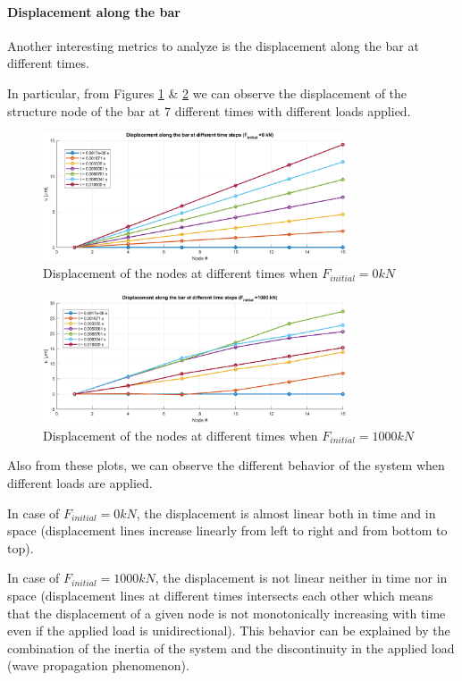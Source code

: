 \paragraph{Displacement along the bar}

Another interesting metrics to analyze is the displacement along the bar at different times.

In particular, from Figures \ref{fig:displacement_F0} \& \ref{fig:displacement_F1000} we can observe the displacement of the structure node of the bar at $7$ different times with different loads applied.

\begin{figure}[H]
    \centering
    \includegraphics[width=0.8\textwidth]{img/displacement_F0.png}
    \caption{Displacement of the nodes at different times when $F_{initial} = 0 kN$}
    \label{fig:displacement_F0}
\end{figure}

\begin{figure}[H]
    \centering
    \includegraphics[width=0.8\textwidth]{img/displacement_F1000.png}
    \caption{Displacement of the nodes at different times when $F_{initial} = 1000 kN$}
    \label{fig:displacement_F1000}
\end{figure}

Also from these plots, we can observe the different behavior of the system when different loads are applied.

In case of $F_{initial} = 0 kN$, the displacement is almost linear both in time and in space (displacement lines increase linearly from left to right and from bottom to top).

In case of $F_{initial} = 1000 kN$, the displacement is not linear neither in time nor in space (displacement lines at different times intersects each other which means that the displacement of a given node is not monotonically increasing with time even if the applied load is unidirectional).
This behavior can be explained by the combination of the inertia of the system and the discontinuity in the applied load (wave propagation phenomenon).


